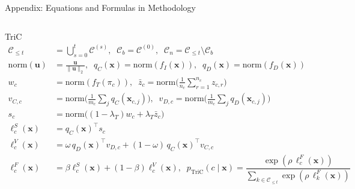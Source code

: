 \documentclass[aspectratio=169,10pt]{beamer}
\begin{document}
\begin{frame}{Appendix: Equations and Formulas in Methodology}
        \hypertarget{appendix}{}
        \begin{columns}[t]
        \begin{alertblock}{TriC}
        \tiny
        \begin{align*}
            \mathcal{C}_{\le t} &= \bigcup_{s=0}^{t}\mathcal{C}^{(s)}, \;\; \mathcal{C}_b=\mathcal{C}^{(0)}, \;\; \mathcal{C}_n=\mathcal{C}_{\le t}\setminus\mathcal{C}_b \\[6pt]
            \text{norm}(\mathbf{u}) &= \tfrac{\mathbf{u}}{\|\mathbf{u}\|_2}, \;\; q_C(\mathbf{x})=\text{norm}(f_I(\mathbf{x})), \;\; q_D(\mathbf{x})=\text{norm}(f_D(\mathbf{x})) \\[6pt]
            w_c &= \text{norm}(f_T(\pi_c)), \;\; \bar{z}_c = \text{norm}\Big(\tfrac{1}{n_c}\textstyle\sum_{r=1}^{n_c} z_{c,r}\Big) \\[6pt]
            v_{C,c} &= \text{norm}\Big(\tfrac{1}{m_c}\textstyle\sum_{j} q_C(\mathbf{x}_{c,j})\Big), \;\; v_{D,c} = \text{norm}\Big(\tfrac{1}{m_c}\textstyle\sum_{j} q_D(\mathbf{x}_{c,j})\Big) \\[6pt]
            s_c &= \text{norm}\big((1-\lambda_T)w_c + \lambda_T \bar{z}_c\big) \\[6pt]
            \ell_c^S(\mathbf{x}) &= q_C(\mathbf{x})^\top s_c \\[6pt]
            \ell_c^V(\mathbf{x}) &= \omega\, q_D(\mathbf{x})^\top v_{D,c} + (1-\omega)\, q_C(\mathbf{x})^\top v_{C,c} \\[6pt]
            \ell_c^F(\mathbf{x}) &= \beta \ell_c^S(\mathbf{x}) + (1-\beta)\ell_c^V(\mathbf{x}), \;\; p_{\text{TriC}}(c\mid \mathbf{x}) = \dfrac{\exp(\rho\, \ell_c^F(\mathbf{x}))}{\sum_{k\in\mathcal{C}_{\le t}} \exp(\rho\, \ell_k^F(\mathbf{x}))}
        \end{align*}
        \end{alertblock}


\end{columns}
\end{frame}
\end{document}
